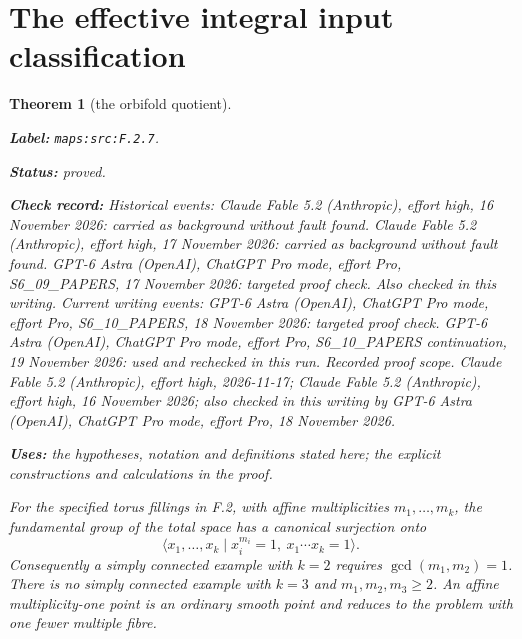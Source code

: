 \documentclass[11pt,a4paper]{article}
\newtheorem{theorem}{Theorem}[section]
\theoremstyle{definition}
\newcommand{\StatementRecord}[4]{\par\smallskip\begingroup\upshape\raggedright\noindent\textbf{Label:} \nolinkurl{#1}.\par\noindent\textbf{Status:} #2.\par\noindent\textbf{Check record:} #3.\par\noindent\textbf{Uses:} #4.\par\endgroup\smallskip}
\begin{document}
\section{The effective integral input classification}



\begin{theorem}[the orbifold quotient]\label{maps:src:F.2.7}
\StatementRecord{maps:src:F.2.7}{proved}{Historical events: Claude Fable 5.2 (Anthropic), effort high, 16 November 2026: carried as background without fault found. Claude Fable 5.2 (Anthropic), effort high, 17 November 2026: carried as background without fault found. GPT-6 Astra (OpenAI), ChatGPT Pro mode, effort Pro, S6\_09\_PAPERS, 17 November 2026: targeted proof check. Also checked in this writing. Current writing events: GPT-6 Astra (OpenAI), ChatGPT Pro mode, effort Pro, S6\_10\_PAPERS, 18 November 2026: targeted proof check. GPT-6 Astra (OpenAI), ChatGPT Pro mode, effort Pro, S6\_10\_PAPERS continuation, 19 November 2026: used and rechecked in this run. \emph{Recorded proof scope.} Claude Fable 5.2 (Anthropic), effort high, 2026-11-17; Claude Fable 5.2 (Anthropic), effort high, 16 November 2026; also checked in this writing by GPT-6 Astra (OpenAI), ChatGPT Pro mode, effort Pro, 18 November 2026}{the hypotheses, notation and definitions stated here; the explicit constructions and calculations in the proof}


For the specified torus fillings in F.2, with affine
multiplicities $m_1,\ldots,m_k$, the fundamental group of the
total space has a canonical surjection onto
\[
 \langle x_1,\ldots,x_k\mid
       x_i^{m_i}=1,\ x_1\cdots x_k=1\rangle.
 \tag{F.27}\label{maps:eq:F.27}
\]
Consequently a simply connected example with $k=2$ requires
$\gcd(m_1,m_2)=1$.  There is no simply connected example with
$k=3$ and $m_1,m_2,m_3\geq2$.  An affine multiplicity-one
point is an ordinary smooth point and reduces to the problem
with one fewer multiple fibre.

\end{theorem}
\end{document}
